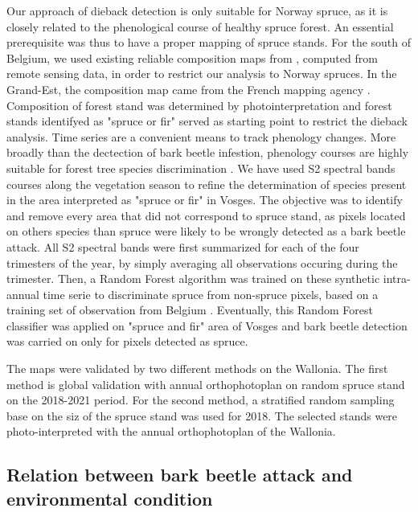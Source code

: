\documentclass[3p,procedia]{elsarticle}
\begin{document}
Our approach of dieback detection is only suitable for Norway spruce, as it is closely related to the phenological course of healthy spruce forest.
An essential prerequisite was thus to have a proper mapping of spruce stands.
For the south of Belgium, we used existing reliable composition maps from \cite{bolyn_mapping_2022}, computed from remote sensing data, in order to restrict our analysis to Norway spruces.
In the Grand-Est, the composition map came from the French mapping agency \citep{IGN_bd_2018}. 
Composition of forest stand was determined by photointerpretation and forest stands identifyed as "spruce or fir" served as starting point to restrict the dieback analysis.
Time series are a convenient means to track phenology changes. 
More broadly than the dectection of bark beetle infestion, phenology courses are highly suitable for forest tree species discrimination \citep{lisein_discrimination_2015,grabska_forest_2019,ma_tree_2021}.
We have used S2 spectral bands courses along the vegetation season to refine the determination of species present in the area interpreted as "spruce or fir" in Vosges.
The objective was to identify and remove every area that did not correspond to spruce stand, as pixels located on others species than spruce were likely to be wrongly detected as a bark beetle attack.
All S2 spectral bands were first summarized for each of the four trimesters of the year, by simply averaging all observations occuring during the trimester.
Then, a Random Forest algorithm was trained on these synthetic intra-annual time serie to discriminate spruce from non-spruce pixels, based on a training set of observation from Belgium \citep{bolyn_forest_2018}.
Eventually, this Random Forest classifier was applied on "spruce and fir" area of Vosges and bark beetle detection was carried on only for pixels detected as spruce. 

The maps were validated by two different methods on the Wallonia.
The first method is global validation with annual orthophotoplan on random spruce stand on the 2018-2021 period. 
For the second method, a stratified random sampling base on  the siz of the spruce stand was used for 2018. 
The selected stands were photo-interpreted with the annual orthophotoplan of the Wallonia.



\subsection{Relation between bark beetle attack and environmental condition}
\end{document}
